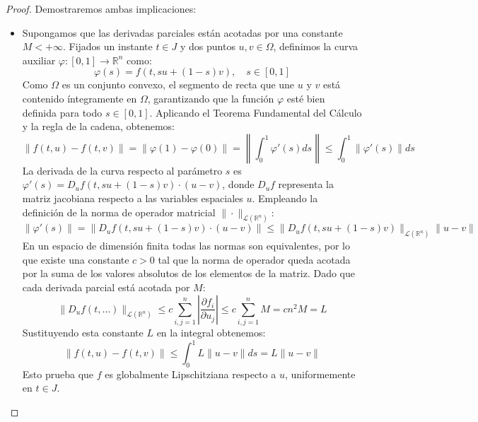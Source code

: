 \begin{proof}
    Demostraremos ambas implicaciones:
    \begin{itemize}
        \item[$\Leftarrow$] Supongamos que las derivadas parciales están acotadas por una constante $M < +\infty$. Fijados un instante $t \in J$ y dos puntos $u, v \in \Omega$, definimos la curva auxiliar $\varphi : [0,1] \to \mathbb{R}^n$ como:
        \[
            \varphi(s) = f(t, su + (1-s)v), \quad s \in [0,1]
        \]
        Como $\Omega$ es un conjunto convexo, el segmento de recta que une $u$ y $v$ está contenido íntegramente en $\Omega$, garantizando que la función $\varphi$ esté bien definida para todo $s \in [0,1]$. Aplicando el Teorema Fundamental del Cálculo y la regla de la cadena, obtenemos:
        \[
            \| f(t,u) - f(t,v) \| = \| \varphi(1) - \varphi(0) \| = \left\| \int_0^1 \varphi'(s) ds \right\| \leq \int_0^1 \| \varphi'(s) \| ds
        \]
        La derivada de la curva respecto al parámetro $s$ es $\varphi'(s) = D_u f(t, su + (1-s)v) \cdot (u - v)$, donde $D_u f$ representa la matriz jacobiana respecto a las variables espaciales $u$. Empleando la definición de la norma de operador matricial $\| \cdot \|_{\mathcal{L}(\mathbb{R}^n)}$:
        \[
            \| \varphi'(s) \| = \| D_u f(t, su + (1-s)v) \cdot (u - v) \| \leq \| D_u f(t, su + (1-s)v) \|_{\mathcal{L}(\mathbb{R}^n)} \| u - v \|
        \]
        En un espacio de dimensión finita todas las normas son equivalentes, por lo que existe una constante $c > 0$ tal que la norma de operador queda acotada por la suma de los valores absolutos de los elementos de la matriz. Dado que cada derivada parcial está acotada por $M$:
        \[
            \| D_u f(t, \dots) \|_{\mathcal{L}(\mathbb{R}^n)} \leq c \sum_{i,j=1}^n \left| \frac{\partial f_i}{\partial u_j} \right| \leq c \sum_{i,j=1}^n M = c n^2 M = L
        \]
        Sustituyendo esta constante $L$ en la integral obtenemos:
        \[
            \| f(t,u) - f(t,v) \| \leq \int_0^1 L \| u - v \| ds = L \| u - v \|
        \]
        Esto prueba que $f$ es globalmente Lipschitziana respecto a $u$, uniformemente en $t \in J$.


\end{itemize}
\end{proof}
